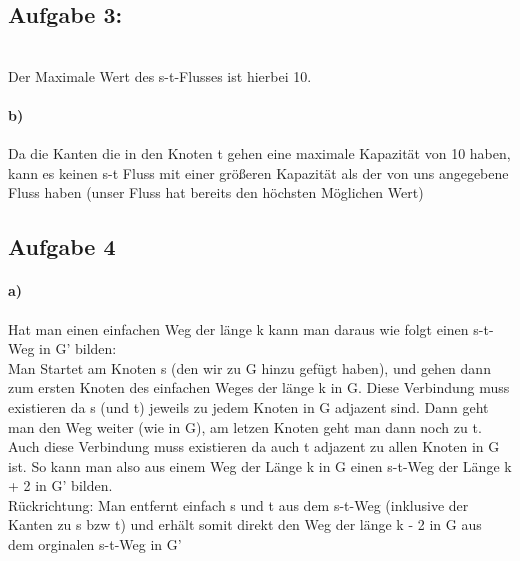 \documentclass[a4paper]{article}
\begin{document}
\subsection*{Aufgabe 3:}
\\
Der Maximale Wert des s-t-Flusses ist hierbei 10.
\paragraph{b)}
Da die Kanten die in den Knoten t gehen eine maximale Kapazität von 10 haben,
kann es keinen s-t Fluss mit einer größeren Kapazität als der von uns 
angegebene Fluss haben (unser Fluss hat bereits den höchsten Möglichen Wert)

\subsection*{Aufgabe 4}
\paragraph{a)}
Hat man einen einfachen Weg der länge k kann man daraus wie folgt einen s-t-Weg
in G' bilden: \\
Man Startet am Knoten s (den wir zu G hinzu gefügt haben), und gehen dann zum 
ersten Knoten des einfachen Weges der länge k in G. Diese Verbindung muss 
existieren da s (und t) jeweils zu jedem Knoten in G adjazent sind. Dann 
geht man den Weg weiter (wie in G), am letzen Knoten geht man dann noch zu t.
Auch diese Verbindung muss existieren da auch t adjazent zu allen Knoten 
in G ist. So kann man also aus einem Weg der Länge k in G einen s-t-Weg der Länge 
k +  2 in G' bilden. \\
Rückrichtung: Man entfernt einfach s und t aus dem s-t-Weg (inklusive der 
Kanten zu s bzw t) und erhält somit direkt den Weg der länge k - 2 in G aus 
dem orginalen s-t-Weg in G'
\end{document}
